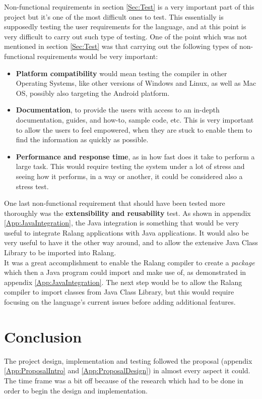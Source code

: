 \documentclass[a4paper]{article}
\begin{document}
	Non-functional requirements in section \ref{Sec:Test} is a very important part of this project but it's one of the most difficult ones to test. This essentially is supposedly testing the user requirements for the language, and at this point is very difficult to carry out such type of testing. One of the point which was not mentioned in section \ref{Sec:Test} was that carrying out the following types of non-functional requirements would be very important:
	\begin{itemize}
		\item \textbf{Platform compatibility} would mean testing the compiler in other Operating Systems, like other versions of Windows and Linux, as well as Mac OS, possibly also targeting the Android platform.
		\item \textbf{Documentation}, to provide the users with access to an in-depth documentation, guides, and how-to, sample code, etc. This is very important to allow the users to feel empowered, when they are stuck to enable them to find the information as quickly as possible.
		\item \textbf{Performance and response time}, as in how fast does it take to perform a large task. This would require testing the system under a lot of stress and seeing how it performs, in a way or another, it could be considered also a stress test.
	\end{itemize}
	One last non-functional requirement that should have been tested more thoroughly was the \textbf{extensibility and reusability} test. As shown in appendix \ref{App:JavaIntegration}, the Java integration is something that would be very useful to integrate Ralang applications with Java applications. It would also be very useful to have it the other way around, and to allow the extensive Java Class Library to be imported into Ralang.\\
	
	It was a great accomplishment to enable the Ralang compiler to create a \textit{package} which then a Java program could import and make use of, as demonstrated in appendix \ref{App:JavaIntegration}. The next step would be to allow the Ralang compiler to import classes from Java Class Library, but this would require focusing on the language's current issues before adding additional features.
	\newpage
	\section{Conclusion}
	\label{Sec:Conclusion}
	The project design, implementation and testing followed the proposal (appendix \ref{App:ProposalIntro} and \ref{App:ProposalDesign}) in almost every aspect it could. The time frame was a bit off because of the research which had to be done in order to begin the design and implementation.\\
	
\end{document}
